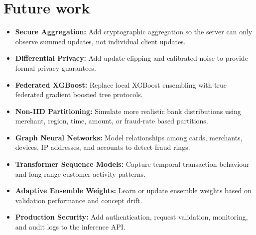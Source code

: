 \section{Future work}
\begin{itemize}
    \item \textbf{Secure Aggregation:} Add cryptographic aggregation so the server can only observe summed updates, not individual client updates.
    \item \textbf{Differential Privacy:} Add update clipping and calibrated noise to provide formal privacy guarantees.
    \item \textbf{Federated XGBoost:} Replace local XGBoost ensembling with true federated gradient boosted tree protocols.
    \item \textbf{Non-IID Partitioning:} Simulate more realistic bank distributions using merchant, region, time, amount, or fraud-rate based partitions.
    \item \textbf{Graph Neural Networks:} Model relationships among cards, merchants, devices, IP addresses, and accounts to detect fraud rings.
    \item \textbf{Transformer Sequence Models:} Capture temporal transaction behaviour and long-range customer activity patterns.
    \item \textbf{Adaptive Ensemble Weights:} Learn or update ensemble weights based on validation performance and concept drift.
    \item \textbf{Production Security:} Add authentication, request validation, monitoring, and audit logs to the inference API.
\end{itemize}
